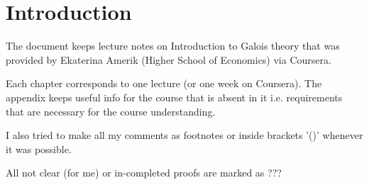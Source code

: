 \chapter*{Introduction}

The document keeps lecture notes on Introduction to Galois theory that
was provided by Ekaterina Amerik (Higher School of Economics) via
Coursera.

Each chapter corresponds to one lecture (or one week on Coursera). The
appendix keeps useful info for the course that is absent in it
i.e. requirements that are necessary for the course understanding.

I also tried to make all my comments as footnotes or inside brackets '()'
whenever it was possible.

All not clear (for me) or in-completed proofs are marked as ???
